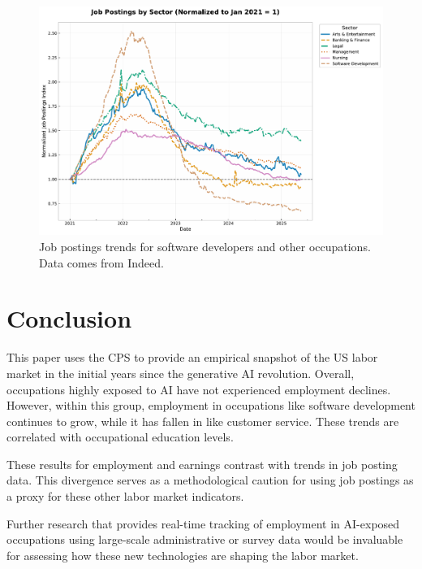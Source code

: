 \documentclass[12pt]{article}
\numberwithin{equation}{section}
\theoremstyle{theorem}\newcustomtheorem{theorem}{{\bf\sc Theorem}}
\theoremstyle{definition}\newcustomtheorem{assumption}{{\bf\sc Assumption}}
\theoremstyle{theorem} \newcustomtheorem{proposition}{{\bf\sc Proposition}}
\begin{document}
\begin{figure}[htbp]
	\centering
  \includegraphics[width=.95\textwidth]{../figures/job_postings_by_sector.pdf}
	\caption{Job postings trends for software developers and other occupations. Data comes from Indeed.}
	\label{fig:job_postings_by_sector}
\end{figure}

\section{Conclusion}

This paper uses the CPS to provide an empirical snapshot of the US labor market in the initial years since the generative AI revolution. Overall, occupations highly exposed to AI have not experienced employment declines. However, within this group, employment in occupations like software development continues to grow, while it has fallen in like customer service. These trends are correlated with occupational education levels. 

These results for employment and earnings contrast with trends in job posting data. This divergence serves as a methodological caution for using job postings as a proxy for these other labor market indicators.

Further research that provides real-time tracking of employment in AI-exposed occupations using large-scale administrative or survey data would be invaluable for assessing how these new technologies are shaping the labor market. 









\clearpage
\end{document}
